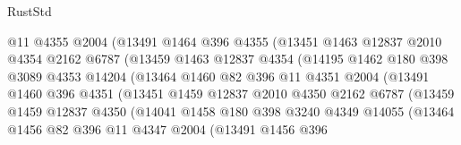 \begin{lexlean}{RustStd}
\begin{coremodule}
                        @11
                        @4355
                        @2004
                        (@13491
                          @1464
                          @396
                          @4355
                          (@13451
                            @1463
                            @12837
                            @2010
                            @4354
                            @2162
                            @6787
                            (@13459
                              @1463
                              @12837
                              @4354
                              (@14195
                                @1462
                                @180
                                @398
                                @3089
                                @4353
                                @14204
                                (@13464
                                  @1460
                                  @82
                                  @396
                                  @11
                                  @4351
                                  @2004
                                  (@13491
                                    @1460
                                    @396
                                    @4351
                                    (@13451
                                      @1459
                                      @12837
                                      @2010
                                      @4350
                                      @2162
                                      @6787
                                      (@13459
                                        @1459
                                        @12837
                                        @4350
                                        (@14041
                                          @1458
                                          @180
                                          @398
                                          @3240
                                          @4349
                                          @14055
                                          (@13464
                                            @1456
                                            @82
                                            @396
                                            @11
                                            @4347
                                            @2004
                                            (@13491
                                              @1456
                                              @396

\end{coremodule}
\end{lexlean}
